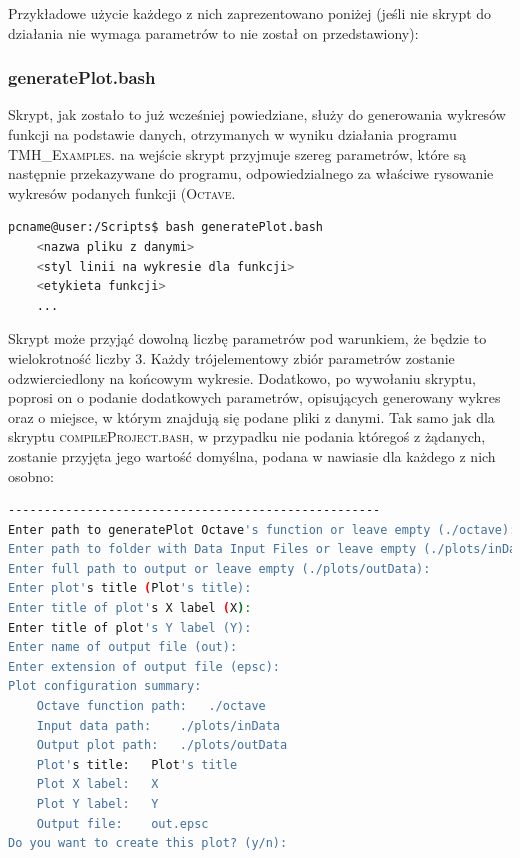 
Przykładowe użycie każdego z nich zaprezentowano poniżej (jeśli nie skrypt do działania nie wymaga parametrów to nie został on przedstawiony):

\subsubsection{generatePlot.bash}

Skrypt, jak zostało to już wcześniej powiedziane, służy do generowania wykresów funkcji na podstawie danych, otrzymanych w wyniku działania programu \textsc{TMH\_Examples}. na wejście skrypt przyjmuje szereg parametrów, które są następnie przekazywane do programu, odpowiedzialnego za właściwe rysowanie wykresów podanych funkcji (\textsc{Octave}.

\begin{lstlisting}[language=bash]
pcname@user:/Scripts$ bash generatePlot.bash 
	<nazwa pliku z danymi>
	<styl linii na wykresie dla funkcji>
	<etykieta funkcji>
	...
\end{lstlisting}

Skrypt może przyjąć dowolną liczbę parametrów pod warunkiem, że będzie to wielokrotność liczby $3$. Każdy trójelementowy zbiór parametrów zostanie odzwierciedlony na końcowym wykresie. Dodatkowo, po wywołaniu skryptu, poprosi on o podanie dodatkowych parametrów, opisujących generowany wykres oraz o miejsce, w którym znajdują się podane pliki z danymi. Tak samo jak dla skryptu \textsc{compileProject.bash}, w przypadku nie podania któregoś z żądanych, zostanie przyjęta jego wartość domyślna, podana w nawiasie dla każdego z nich osobno:

\small
\begin{lstlisting}[language=bash]
----------------------------------------------------
Enter path to generatePlot Octave's function or leave empty (./octave):
Enter path to folder with Data Input Files or leave empty (./plots/inData):
Enter full path to output or leave empty (./plots/outData):
Enter plot's title (Plot's title):
Enter title of plot's X label (X):
Enter title of plot's Y label (Y):
Enter name of output file (out):
Enter extension of output file (epsc):
Plot configuration summary: 
	Octave function path:	./octave
	Input data path:	./plots/inData
	Output plot path:	./plots/outData
	Plot's title:	Plot's title
	Plot X label:	X
	Plot Y label:	Y
	Output file:	out.epsc
Do you want to create this plot? (y/n):
\end{lstlisting}
\normalsize

